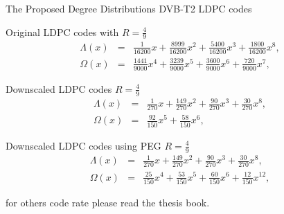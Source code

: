 \documentclass[11pt, aspectratio=169]{beamer}
\begin{document}
\begin{frame}{The Proposed Degree Distributions DVB-T2 LDPC codes}
	
	{\footnotesize  
		Original LDPC codes with $R=\frac{4}{9}$ 
		\begin{eqnarray}
		\Lambda (x) &=& \frac{1}{16200}x+\frac{8999}{16200}x^2+\frac{5400}{16200}x^3+\frac{1800}{16200}x^8, \\
		\Omega(x) &=& \frac{1441}{9000}x^4+\frac{3239}{9000}x^5+\frac{3600}{9000}x^6+\frac{720}{9000}x^7,
		\end{eqnarray}
		
		Downscaled LDPC codes $R=\frac{4}{9}$ 
		\begin{eqnarray}
		\Lambda (x) &=& \frac{1}{270}x+\frac{149}{270}x^2+\frac{90}{270}x^3+\frac{30}{270}x^8, \\
		\Omega(x) &=& \frac{92}{150}x^5+\frac{58}{150}x^6,
		\end{eqnarray}
		
		Downscaled LDPC codes using PEG $R=\frac{4}{9}$ 
		\begin{eqnarray}
		\Lambda (x)&=&\frac{1}{270}x+\frac{149}{270}x^2+\frac{90}{270}x^3+\frac{30}{270}x^8, \\
		\Omega(x)&=&\frac{25}{150}x^4+\frac{53}{150}x^5+\frac{60}{150}x^6+\frac{12}{150}x^{12},
		\end{eqnarray}
		
		for others code rate please read the thesis book.
%		
%		
%
	}
\end{frame}
%	
\end{document}
